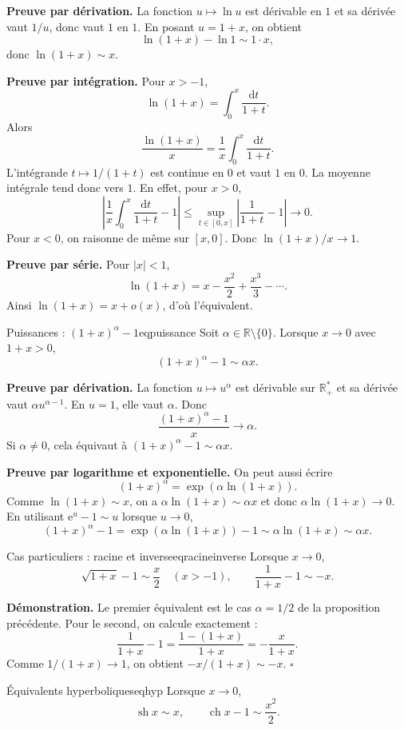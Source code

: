 \documentclass[11pt,a4paper]{article}
\newcommand{\R}{\mathbb{R}}
\newcommand{\e}{\mathrm{e}}
\newcommand{\dd}{\mathrm{d}}
\DeclareMathOperator{\sh}{sh}
\DeclareMathOperator{\ch}{ch}
\begin{document}
\textbf{Preuve par dérivation.} La fonction $u\mapsto\ln u$ est dérivable en $1$ et sa dérivée vaut $1/u$, donc vaut $1$ en $1$. En posant $u=1+x$, on obtient
\[
  \ln(1+x)-\ln1\sim 1\cdot x,
\]
donc $\ln(1+x)\sim x$.

\textbf{Preuve par intégration.} Pour $x>-1$,
\[
  \ln(1+x)=\int_0^x \frac{\dd t}{1+t}.
\]
Alors
\[
  \frac{\ln(1+x)}{x}=\frac1x\int_0^x \frac{\dd t}{1+t}.
\]
L'intégrande $t\mapsto1/(1+t)$ est continue en $0$ et vaut $1$ en $0$. La moyenne intégrale tend donc vers $1$. En effet, pour $x>0$,
\[
\left|\frac1x\int_0^x \frac{\dd t}{1+t}-1\right|
\le \sup_{t\in[0,x]}\left|\frac1{1+t}-1\right|\to0.
\]
Pour $x<0$, on raisonne de même sur $[x,0]$. Donc $\ln(1+x)/x\to1$.

\textbf{Preuve par série.} Pour $|x|<1$,
\[
  \ln(1+x)=x-\frac{x^2}{2}+\frac{x^3}{3}-\cdots.
\]
Ainsi $\ln(1+x)=x+o(x)$, d'où l'équivalent.

\begin{propositionbox}{Puissances : $(1+x)^\alpha-1$}{eqpuissance}
Soit $\alpha\in\R\setminus\{0\}$. Lorsque $x\to0$ avec $1+x>0$,
\[
  (1+x)^\alpha-1\sim \alpha x.
\]
\end{propositionbox}

\textbf{Preuve par dérivation.} La fonction $u\mapsto u^\alpha$ est dérivable sur $\R_+^*$ et sa dérivée vaut $\alpha u^{\alpha-1}$. En $u=1$, elle vaut $\alpha$. Donc
\[
  \frac{(1+x)^\alpha-1}{x}\to \alpha.
\]
Si $\alpha\ne0$, cela équivaut à $(1+x)^\alpha-1\sim \alpha x$.

\textbf{Preuve par logarithme et exponentielle.} On peut aussi écrire
\[
  (1+x)^\alpha=\exp(\alpha\ln(1+x)).
\]
Comme $\ln(1+x)\sim x$, on a $\alpha\ln(1+x)\sim\alpha x$ et donc $\alpha\ln(1+x)\to0$. En utilisant $\e^u-1\sim u$ lorsque $u\to0$,
\[
  (1+x)^\alpha-1=\exp(\alpha\ln(1+x))-1\sim \alpha\ln(1+x)\sim \alpha x.
\]

\begin{propositionbox}{Cas particuliers : racine et inverse}{eqracineinverse}
Lorsque $x\to0$,
\[
  \sqrt{1+x}-1\sim\frac{x}{2}\quad(x>-1),
  \qquad
  \frac1{1+x}-1\sim -x.
\]
\end{propositionbox}

\textbf{Démonstration.} Le premier équivalent est le cas $\alpha=1/2$ de la proposition précédente. Pour le second, on calcule exactement :
\[
  \frac1{1+x}-1=\frac{1-(1+x)}{1+x}=-\frac{x}{1+x}.
\]
Comme $1/(1+x)\to1$, on obtient $-x/(1+x)\sim -x$.
\hfill $\square$

\begin{propositionbox}{Équivalents hyperboliques}{eqhyp}
Lorsque $x\to0$,
\[
  \sh x\sim x,
  \qquad
  \ch x-1\sim\frac{x^2}{2}.
\]
\end{propositionbox}
\end{document}
